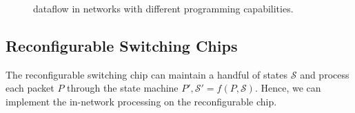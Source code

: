 \begin{figure}[t]
\centering
{}
\hspace{0.04\textwidth}
\hspace{0.04\textwidth}
\caption{\sys dataflow in networks with different programming capabilities.}
\label{fig:impl}
\vspace{-1em}
\end{figure}

\subsection{Reconfigurable Switching Chips}
\label{sec:p4}
The reconfigurable switching chip can maintain 
a handful of states $\mathcal{S}$ and process each packet $P$ through the state machine $P', \mathcal{S}' = f(P, \mathcal{S})$. Hence, we can implement the in-network processing on the reconfigurable chip. 

